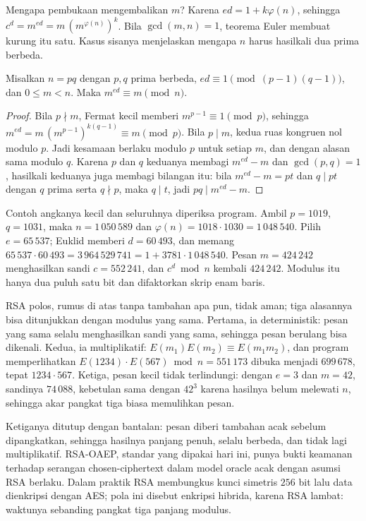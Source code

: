Mengapa pembukaan mengembalikan $m$? Karena $ed=1+k\varphi(n)$, sehingga
$c^d=m^{ed}=m\,(m^{\varphi(n)})^k$. Bila $\gcd(m,n)=1$, teorema Euler membuat kurung itu satu.
Kasus sisanya menjelaskan mengapa $n$ harus hasilkali dua prima berbeda.

\begin{teorema}
Misalkan $n=pq$ dengan $p,q$ prima berbeda, $ed\equiv1\pmod{(p-1)(q-1)}$, dan $0\le m<n$.
Maka $m^{ed}\equiv m\pmod n$.
\end{teorema}

\begin{proof}
Bila $p\nmid m$, Fermat kecil memberi $m^{p-1}\equiv1\pmod p$, sehingga
$m^{ed}=m\,(m^{p-1})^{k(q-1)}\equiv m\pmod p$. Bila $p\mid m$, kedua ruas kongruen nol modulo
$p$. Jadi kesamaan berlaku modulo $p$ untuk setiap $m$, dan dengan alasan sama modulo $q$.
Karena $p$ dan $q$ keduanya membagi $m^{ed}-m$ dan $\gcd(p,q)=1$, hasilkali keduanya juga
membagi bilangan itu: bila $m^{ed}-m=pt$ dan $q\mid pt$ dengan $q$ prima serta $q\nmid p$,
maka $q\mid t$, jadi $pq\mid m^{ed}-m$.
\end{proof}

Contoh angkanya kecil dan seluruhnya diperiksa program. Ambil $p=1019$, $q=1031$, maka
$n=1\,050\,589$ dan $\varphi(n)=1018\cdot1030=1\,048\,540$. Pilih $e=65\,537$; Euklid memberi
$d=60\,493$, dan memang $65\,537\cdot60\,493=3\,964\,529\,741=1+3781\cdot1\,048\,540$. Pesan
$m=424\,242$ menghasilkan sandi $c=552\,241$, dan $c^d\bmod n$ kembali $424\,242$. Modulus itu hanya dua puluh satu bit dan difaktorkan skrip enam baris.

RSA polos, rumus di atas tanpa tambahan apa pun, tidak aman; tiga alasannya bisa ditunjukkan
dengan modulus yang sama. Pertama, ia deterministik: pesan yang sama selalu menghasilkan sandi
yang sama, sehingga pesan berulang bisa dikenali. Kedua, ia multiplikatif:
$E(m_1)E(m_2)\equiv E(m_1m_2)$, dan program memperlihatkan
$E(1234)\cdot E(567)\bmod n=551\,173$ dibuka menjadi $699\,678$, tepat $1234\cdot567$. Ketiga,
pesan kecil tidak terlindungi: dengan $e=3$ dan $m=42$, sandinya $74\,088$, kebetulan sama
dengan $42^3$ karena hasilnya belum melewati $n$, sehingga akar pangkat tiga biasa memulihkan
pesan.

Ketiganya ditutup dengan bantalan: pesan diberi tambahan acak sebelum dipangkatkan, sehingga
hasilnya panjang penuh, selalu berbeda, dan tidak lagi multiplikatif. RSA-OAEP, standar yang
dipakai hari ini, punya bukti keamanan terhadap serangan chosen-ciphertext dalam model oracle
acak dengan asumsi RSA berlaku. Dalam praktik RSA membungkus kunci simetris $256$ bit lalu data
dienkripsi dengan AES; pola ini disebut enkripsi hibrida, karena RSA lambat: waktunya
sebanding pangkat tiga panjang modulus.

